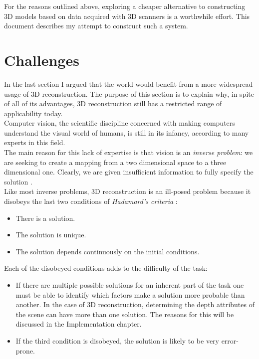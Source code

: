 \documentclass[12pt,a4paper,twoside,openright]{report}
\begin{document}
For the reasons outlined above, exploring a cheaper alternative to constructing 3D models based on data acquired with 3D scanners is a worthwhile effort. This document describes my attempt to construct such a system. 

\section{Challenges}
In the last section I argued that the world would benefit from a more widespread usage of 3D reconstruction. The purpose of this section is to explain why, in spite of all of its advantages, 3D reconstruction still has a restricted range of applicability today. \\
\linebreak
Computer vision, the scientific discipline concerned with making computers understand the visual world of humans, is still in its infancy, according to many experts in this field. \\
The main reason for this lack of expertise is that vision is an \textit{inverse problem}: we are seeking to create a mapping from a two dimensional space to a three dimensional one. Clearly, we are given insufficient information to fully specify the solution \cite[p.~3]{Szeliski+2011}.\\
\linebreak
Like most inverse problems, 3D reconstruction is an ill-posed problem because it disobeys the last two conditions of \textit{Hadamard's criteria} \cite[p.~35]{+2008}:
\begin{itemize}
\item There is a solution.
\item The solution is unique.
\item The solution depends continuously on the initial conditions.
\end{itemize}
Each of the disobeyed conditions adds to the difficulty of the task:\\
\begin{itemize}
\item If there are multiple possible solutions for an inherent part of the task one must be able to identify which factors make a solution more probable than another. In the case of 3D reconstruction, determining the depth attributes of the scene can have more than one solution. The reasons for this will be discussed in the Implementation chapter.
\item If the third condition is disobeyed, the solution is likely to be very error-prone.
\end{itemize}
\end{document}
